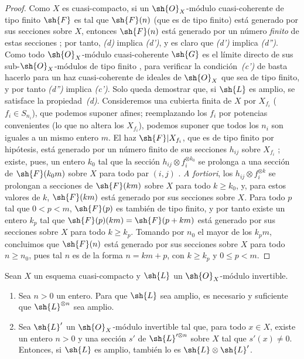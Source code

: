 \documentclass[oneside,10pt]{amsart}
\renewcommand{\leq}{\leqslant}
\renewcommand{\geq}{\geqslant}
\newcommand{\oldpage}[2][]{\marginnote{\normalfont\footnotesize\textbf{#1}~|~#2}\ignorespaces}
\let\EGAOriginalLabel\label
\renewcommand{\label}[1]{\phantomsection\EGAOriginalLabel{#1}}
\begin{document}
\begin{proof}
Como $X$ es cuasi-compacto, si un $\sh{O}_X$-módulo cuasi-coherente de tipo finito $\sh{F}$ es tal que $\sh{F}(n)$ (que es de tipo finito) está generado por sus secciones sobre $X$, entonces $\sh{F}(n)$ está generado por un número \emph{finito} de estas secciones ;
por tanto, \emph{(d)} implica \emph{(d')}, y es claro que \emph{(d')} implica \emph{(d'')}.
Como todo $\sh{O}_X$-módulo cuasi-coherente $\sh{G}$ es el límite directo de sus sub-$\sh{O}_X$-módulos de tipo finito , para verificar la condición~\emph{(c')} de  basta hacerlo para un haz cuasi-coherente de ideales de $\sh{O}_X$ que sea de tipo finito, y por tanto \emph{(d'')} implica \emph{(c')}.
Solo queda demostrar que, si $\sh{L}$ es amplio, se satisface la propiedad~\emph{(d)}.
Consideremos una cubierta finita de $X$ por $X_{f_i}$ ($f_i\in S_{n_i}$), que podemos suponer afines;
reemplazando los $f_i$ por potencias convenientes (lo que no altera los $X_{f_i}$), podemos suponer que todos los $n_i$ son iguales a un mismo entero $m$.
El haz $\sh{F}|X_{f_i}$, que es de tipo finito por hipótesis, está generado por un número finito de sus secciones $h_{ij}$ sobre $X_{f_i}$ ;
existe, pues, un entero $k_0$ tal que la sección $h_{ij}\otimes f_i^{\otimes k_0}$ se prolonga a una sección de $\sh{F}(k_0m)$ sobre $X$ para todo par $(i,j)$ .
\emph{A fortiori}, los $h_{ij}\otimes f_i^{\otimes k}$ se prolongan a secciones de $\sh{F}(km)$ sobre $X$ para todo $k\geq k_0$, y, para estos valores de $k$, $\sh{F}(km)$ está generado por sus secciones sobre $X$.
Para todo $p$ tal que $0<p<m$, $\sh{F}(p)$ es también de tipo finito, y por tanto existe un entero $k_p$ tal que $\sh{F}(p)(km)=\sh{F}(p+km)$ está generado por sus secciones sobre $X$ para todo $k\geq k_p$.
Tomando por $n_0$ el mayor de los $k_pm$, concluimos que $\sh{F}(n)$ está generado por sus secciones sobre $X$ para todo $n\geq n_0$, pues tal $n$ es de la forma $n=km+p$, con $k\geq k_p$ y $0\leq p<m$.
\end{proof}

\begin{proposition}[4.5.6]
\label{II.4.5.6}
Sean $X$ un esquema cuasi-compacto y $\sh{L}$ un $\sh{O}_X$-módulo invertible.
\begin{enumerate}
  \item[\rm{(i)}] Sea $n>0$ un entero. Para que $\sh{L}$ sea amplio, es necesario y suficiente que $\sh{L}^{\otimes n}$ sea amplio.
  \item[\rm{(ii)}] Sea $\sh{L}'$ un $\sh{O}_X$-módulo invertible tal que, para todo $x\in X$, existe un entero $n>0$
\oldpage[II]{86}
    y una sección $s'$ de $\sh{L}'^{\otimes n}$ sobre $X$ tal que $s'(x)\neq0$.
    Entonces, si $\sh{L}$ es amplio, también lo es $\sh{L}\otimes\sh{L}'$.
\end{enumerate}
\end{proposition}
\end{document}
